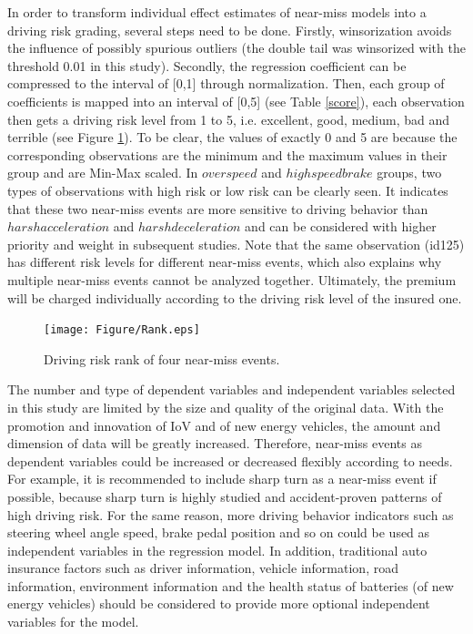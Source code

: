 \documentclass[num-refs]{wiley-article}
\begin{document}
In order to transform individual effect estimates of near-miss models into a driving risk grading, several steps need to be done. Firstly, winsorization avoids the influence of possibly spurious outliers (the double tail was winsorized with the threshold 0.01 in this study). Secondly, the regression coefficient can be compressed to the interval of [0,1] through normalization. Then, each group of coefficients is mapped into an interval of [0,5] (see Table \ref{score}), each observation then gets a driving risk level from 1 to 5, i.e. excellent, good, medium, bad and terrible (see Figure \ref{rank}). To be clear, the values of exactly 0 and 5 are because the corresponding observations are the minimum and the maximum values in their group and are Min-Max scaled. In $overspeed$ and $highspeedbrake$ groups, two types of observations with high risk or low risk can be clearly seen. It indicates that these two near-miss events are more sensitive to driving behavior than $harshacceleration$ and $harshdeceleration$ and can be considered with higher priority and weight in subsequent studies. Note that the same observation (id125) has different risk levels for different near-miss events, which also explains why multiple near-miss events cannot be analyzed together. Ultimately, the premium will be charged individually according to the driving risk level of the insured one. 

\begin{figure}[htbp]
\centering
\texttt{[image: Figure/Rank.eps]}
\caption{Driving risk rank of four near-miss events.}
\label{rank}
\end{figure} 

The number and type of dependent variables and independent variables selected in this study are limited by the size and quality of the original data. With the promotion and innovation of IoV and  of new energy vehicles, the amount and dimension of data will be greatly increased. Therefore, near-miss events as dependent variables could be increased or decreased flexibly according to needs. For example, it is recommended to include sharp turn as a near-miss event if possible, because sharp turn is highly studied and accident-proven patterns of high driving risk. For the same reason, more driving behavior indicators such as steering wheel angle speed, brake pedal position and so on could be used as independent variables in the regression model. In addition, traditional auto insurance factors such as driver information, vehicle information, road information, environment information and the health status of batteries (of new energy vehicles) should be considered to provide more optional independent variables for the model.
\end{document}
